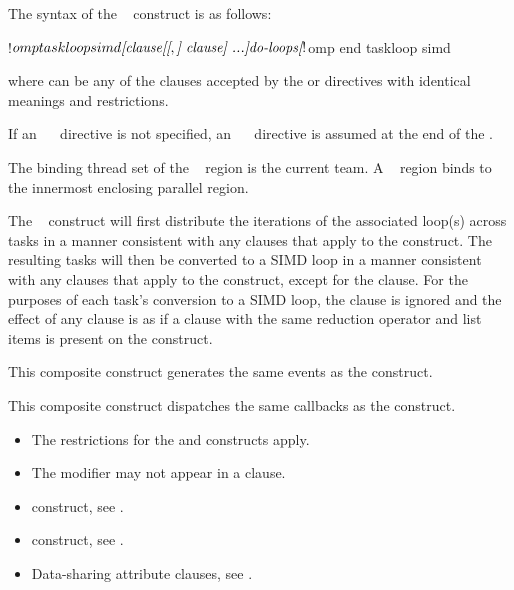 \begin{fortranspecific}
The syntax of the ~ construct is as follows:
\begin{ompfPragma}
!$omp taskloop simd \plc{[clause[[},\plc{] clause] ...]}
    \plc{do-loops}
\plc{[}!$omp end taskloop simd\plc{]}
\end{ompfPragma}
where  can be any of the clauses accepted by the  
or  directives with identical meanings and restrictions.

If an ~~ directive is not specified, an 
~~ directive is assumed at the end of 
the .
\end{fortranspecific}

\binding
The binding thread set of the ~ region is the current 
team. A ~ region binds to the innermost enclosing 
parallel region.

\descr
The ~ construct will first distribute the iterations 
of the associated loop(s) across tasks in a manner consistent with any clauses 
that apply to the  construct. The resulting tasks will then be 
converted to a SIMD loop in a manner consistent with any clauses that apply to 
the  construct, except for the  clause. For the purposes 
of each task's conversion to a SIMD loop, the  clause is ignored 
and the effect of any  clause is as if a  
clause with the same reduction operator and list items is present on the construct.

\events

This composite construct generates the same events as the  construct.

\tools

This composite construct dispatches the same callbacks as the  construct.

\restrictions
\begin{itemize}
\item The restrictions for the  and  constructs apply.
\item The  modifier may not appear in a  clause.
\end{itemize}

\crossreferences
\begin{itemize}
\item {} construct, see .

\item {} construct, see .

\item Data-sharing attribute clauses, see 
.
\end{itemize}

